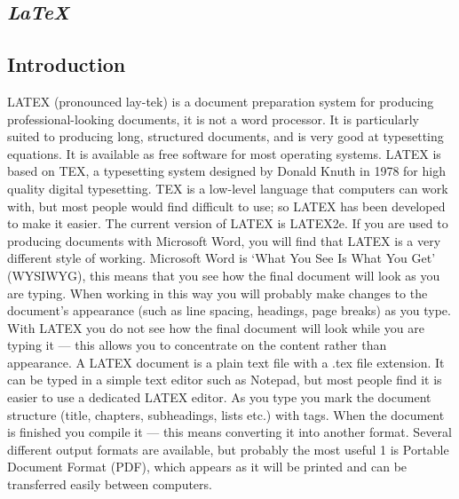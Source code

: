 \documentclass[12pt, document]{article}
\begin{document}
\begin{center}
\chapter{\textbf{\Huge \textit{LaTeX}}}
\end{center}
\vspace{1cm}

\begin{center}
\chapter{\textbf{Introduction}}
\end{center}
\vspace{0.5cm}

\hspace{1cm} LATEX (pronounced lay-tek) is a document preparation system for producing
professional-looking documents, it is not a word processor. It is particularly
suited to producing long, structured documents, and is very good at typesetting equations. It is available as free software for most operating systems.
LATEX is based on TEX, a typesetting system designed by Donald Knuth in
1978 for high quality digital typesetting. TEX is a low-level language that
computers can work with, but most people would find difficult to use; so
LATEX has been developed to make it easier. The current version of LATEX is
LATEX2e.
If you are used to producing documents with Microsoft Word, you will find
that LATEX is a very different style of working. Microsoft Word is ‘What You
See Is What You Get’ (WYSIWYG), this means that you see how the final
document will look as you are typing. When working in this way you will
probably make changes to the document’s appearance (such as line spacing,
headings, page breaks) as you type. With LATEX you do not see how the final
document will look while you are typing it — this allows you to concentrate
on the content rather than appearance.
A LATEX document is a plain text file with a .tex file extension. It can be typed
in a simple text editor such as Notepad, but most people find it is easier to
use a dedicated LATEX editor. As you type you mark the document structure
(title, chapters, subheadings, lists etc.) with tags. When the document
is finished you compile it — this means converting it into another format.
Several different output formats are available, but probably the most useful
1
is Portable Document Format (PDF), which appears as it will be printed and
can be transferred easily between computers.
\thispagestyle{empty}
\end{document}

